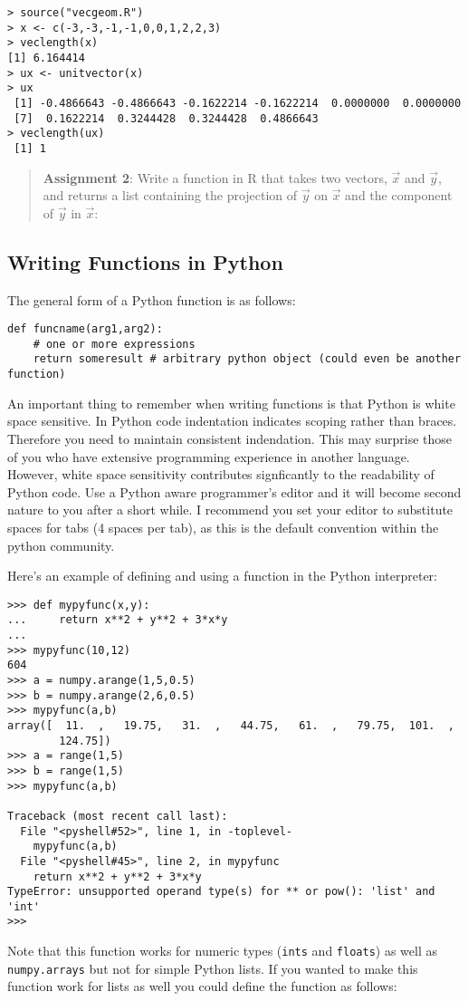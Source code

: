 \begin{lstlisting}
> source("vecgeom.R")
> x <- c(-3,-3,-1,-1,0,0,1,2,2,3)
> veclength(x)
[1] 6.164414
> ux <- unitvector(x)
> ux
 [1] -0.4866643 -0.4866643 -0.1622214 -0.1622214  0.0000000  0.0000000
 [7]  0.1622214  0.3244428  0.3244428  0.4866643
> veclength(ux)
 [1] 1
\end{lstlisting}
\begin{quote}
\textbf{Assignment 2}: Write a function in R that takes two vectors,
$\vec{x}$ and $\vec{y}$, and returns a list containing the projection of
$\vec{y}$ on $\vec{x}$ and the component of $\vec{y}$ in $\vec{x}$:


\end{quote}
\subsection{Writing Functions in Python}

The general form of a Python function is as follows:

\begin{lstlisting}
def funcname(arg1,arg2):
    # one or more expressions
    return someresult # arbitrary python object (could even be another function)
\end{lstlisting}
An important thing to remember when writing functions is that Python is
white space sensitive. In Python code indentation indicates scoping
rather than braces. Therefore you need to maintain consistent
indendation. This may surprise those of you who have extensive
programming experience in another language. However, white space
sensitivity contributes signficantly to the readability of Python code.
Use a Python aware programmer's editor and it will become second nature
to you after a short while. I recommend you set your editor to
substitute spaces for tabs (4 spaces per tab), as this is the default
convention within the python community.

Here's an example of defining and using a function in the Python
interpreter:

\begin{lstlisting}
>>> def mypyfunc(x,y):
...     return x**2 + y**2 + 3*x*y
... 
>>> mypyfunc(10,12)
604
>>> a = numpy.arange(1,5,0.5)
>>> b = numpy.arange(2,6,0.5)
>>> mypyfunc(a,b)
array([  11.  ,   19.75,   31.  ,   44.75,   61.  ,   79.75,  101.  ,
        124.75])
>>> a = range(1,5)
>>> b = range(1,5)
>>> mypyfunc(a,b)

Traceback (most recent call last):
  File "<pyshell#52>", line 1, in -toplevel-
    mypyfunc(a,b)
  File "<pyshell#45>", line 2, in mypyfunc
    return x**2 + y**2 + 3*x*y
TypeError: unsupported operand type(s) for ** or pow(): 'list' and 'int'
>>> 
\end{lstlisting}
Note that this function works for numeric types (\lstinline!ints! and
\lstinline!floats!) as well as \lstinline!numpy.arrays! but not for
simple Python lists. If you wanted to make this function work for lists
as well you could define the function as follows:


